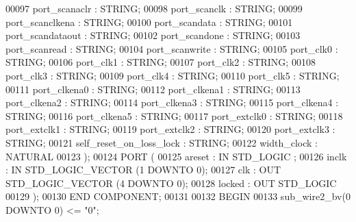 \begin{DoxyCode}
{00097         port\_scanaclr       : \textcolor{comment}{STRING};
00098         port\_scanclk        : \textcolor{comment}{STRING};
00099         port\_scanclkena     : \textcolor{comment}{STRING};
00100         port\_scandata       : \textcolor{comment}{STRING};
00101         port\_scandataout        : \textcolor{comment}{STRING};
00102         port\_scandone       : \textcolor{comment}{STRING};
00103         port\_scanread       : \textcolor{comment}{STRING};
00104         port\_scanwrite      : \textcolor{comment}{STRING};
00105         port\_clk0       : \textcolor{comment}{STRING};
00106         port\_clk1       : \textcolor{comment}{STRING};
00107         port\_clk2       : \textcolor{comment}{STRING};
00108         port\_clk3       : \textcolor{comment}{STRING};
00109         port\_clk4       : \textcolor{comment}{STRING};
00110         port\_clk5       : \textcolor{comment}{STRING};
00111         port\_clkena0        : \textcolor{comment}{STRING};
00112         port\_clkena1        : \textcolor{comment}{STRING};
00113         port\_clkena2        : \textcolor{comment}{STRING};
00114         port\_clkena3        : \textcolor{comment}{STRING};
00115         port\_clkena4        : \textcolor{comment}{STRING};
00116         port\_clkena5        : \textcolor{comment}{STRING};
00117         port\_extclk0        : \textcolor{comment}{STRING};
00118         port\_extclk1        : \textcolor{comment}{STRING};
00119         port\_extclk2        : \textcolor{comment}{STRING};
00120         port\_extclk3        : \textcolor{comment}{STRING};
00121         self\_reset\_on\_loss\_lock     : \textcolor{comment}{STRING};
00122         width\_clock     : \textcolor{comment}{NATURAL}
00123     );
00124     \textcolor{keywordflow}{PORT} (
00125             areset  : \textcolor{keywordflow}{IN} \textcolor{comment}{STD\_LOGIC} ;
00126             inclk   : \textcolor{keywordflow}{IN} \textcolor{comment}{STD\_LOGIC\_VECTOR} (\textcolor{vhdllogic}{}\textcolor{vhdllogic}{1} \textcolor{keywordflow}{DOWNTO} \textcolor{vhdllogic}{}\textcolor{vhdllogic}{0});
00127             clk : \textcolor{keywordflow}{OUT} \textcolor{comment}{STD\_LOGIC\_VECTOR} (\textcolor{vhdllogic}{}\textcolor{vhdllogic}{4} \textcolor{keywordflow}{DOWNTO} \textcolor{vhdllogic}{}\textcolor{vhdllogic}{0});
00128             locked  : \textcolor{keywordflow}{OUT} \textcolor{comment}{STD\_LOGIC} 
00129     );
00130     \textcolor{keywordflow}{END} \textcolor{keywordflow}{COMPONENT};
00131 
00132 \textcolor{vhdlkeyword}{BEGIN}
00133     \textcolor{vhdlchar}{sub_wire2_bv}\textcolor{vhdlchar}{(}\textcolor{vhdllogic}{}\textcolor{vhdllogic}{0} \textcolor{keywordflow}{DOWNTO} \textcolor{vhdllogic}{}\textcolor{vhdllogic}{0}\textcolor{vhdlchar}{)} \textcolor{vhdlchar}{<=} \textcolor{vhdllogic}{"0"};
}
\end{DoxyCode}
